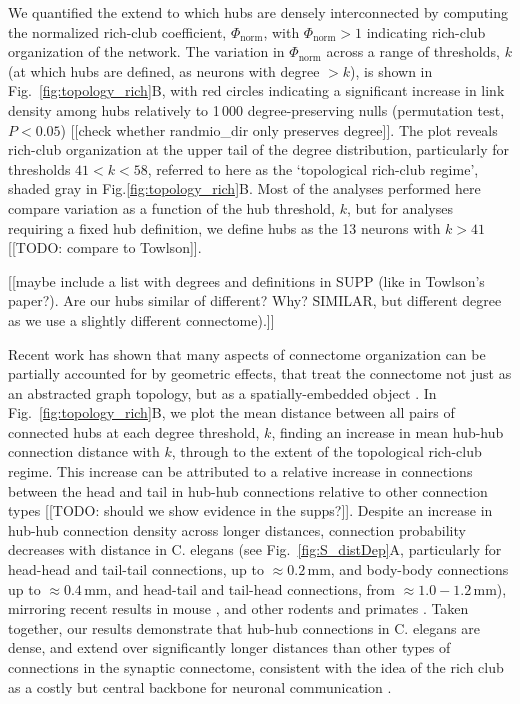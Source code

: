 \documentclass[10pt,letterpaper]{article}
\begin{document}
We quantified the extend to which hubs are densely interconnected by computing the normalized rich-club coefficient, $\Phi_\mathrm{norm}$, with $\Phi_\mathrm{norm} > 1$ indicating rich-club organization of the network.
The variation in $\Phi_\mathrm{norm}$ across a range of thresholds, $k$ (at which hubs are defined, as neurons with degree $>k$), is shown in Fig.~\ref{fig:topology_rich}B, with red circles indicating a significant increase in link density among hubs relatively to 1\,000 degree-preserving nulls (permutation test, $P < 0.05$) [[check whether randmio\_dir only preserves degree]].
The plot reveals rich-club organization at the upper tail of the degree distribution, particularly for thresholds $41 < k < 58$, referred to here as the `topological rich-club regime', shaded gray in Fig.\ref{fig:topology_rich}B.
Most of the analyses performed here compare variation as a function of the hub threshold, $k$, but for analyses requiring a fixed hub definition, we define hubs as the 13 neurons with $k > 41$ [[TODO: compare to Towlson]].

[[maybe include a list with degrees and definitions in SUPP (like in Towlson's paper?). Are our hubs similar of different? Why? SIMILAR, but different degree as we use a slightly different connectome).]]

Recent work has shown that many aspects of connectome organization can be partially accounted for by geometric effects, that treat the connectome not just as an abstracted graph topology, but as a spatially-embedded object \cite{Henderson:2014fg, Roberts2016, Horvat:2016ia}.
In Fig.~\ref{fig:topology_rich}B, we plot the mean distance between all pairs of connected hubs at each degree threshold, $k$, finding an increase in mean hub-hub connection distance with $k$, through to the extent of the topological rich-club regime.
This increase can be attributed to a relative increase in connections between the head and tail in hub-hub connections relative to other connection types [[TODO: should we show evidence in the supps?]].
Despite an increase in hub-hub connection density across longer distances, connection probability decreases with distance in C. elegans (see Fig.~\ref{fig:S_distDep}A, particularly for head-head and tail-tail connections, up to $\approx 0.2$\,mm, and body-body connections up to $\approx 0.4$\,mm, and head-tail and tail-head connections, from $\approx 1.0-1.2$\,mm), mirroring recent results in mouse \cite{Goulas:2016hr, Fulcher:2016ck}, and other rodents and primates \cite{Horvat:2016ia}.
Taken together, our results demonstrate that hub-hub connections in C. elegans are dense, and extend over significantly longer distances than other types of connections in the synaptic connectome, consistent with the idea of the rich club as a costly but central backbone for neuronal communication \cite{vandenHeuvel:2012kh}.
\end{document}
